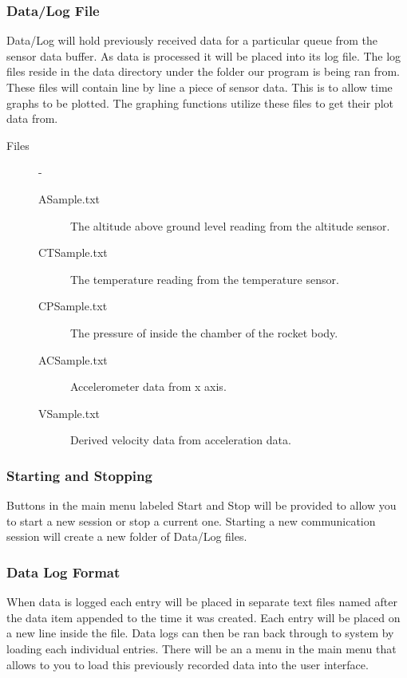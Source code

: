 \documentclass[10pt,draftclsnofoot,onecolumn,compsoc]{IEEEtran}
\begin{document}
\subsubsection{Data/Log File}
Data/Log will hold previously received data for a particular queue from the sensor data buffer. As data is processed it will be placed into its log file. The log files reside in the data directory under the folder our program is being ran from. These files will contain line by line a piece of sensor data. This is to allow time graphs to be plotted. The graphing functions utilize these files to get their plot data from.
\begin{description}
	\item[Files]  -
		\begin{description}
			\item[ASample.txt] The altitude above ground level reading from the altitude sensor.
			\item[CTSample.txt] The temperature reading from the temperature sensor.
			\item[CPSample.txt] The pressure of inside the chamber of the rocket body.
			\item[ACSample.txt] Accelerometer data from x axis.
			\item[VSample.txt] Derived velocity data from acceleration data.
		\end{description}
\end{description}

\subsubsection{Starting and Stopping}
Buttons in the main menu labeled Start and Stop will be provided to allow you to start a new session or stop a current one. Starting a new communication session will create a new folder of Data/Log files.

\subsubsection{Data Log Format}
When data is logged each entry will be placed in separate text files named after the data item appended to the time it was created. Each entry will be placed on a new line inside the file. Data logs can then be ran back through to system by loading each individual entries. There will be an a menu in the main menu that allows to you to load this previously recorded data into the user interface. \par
\end{document}
